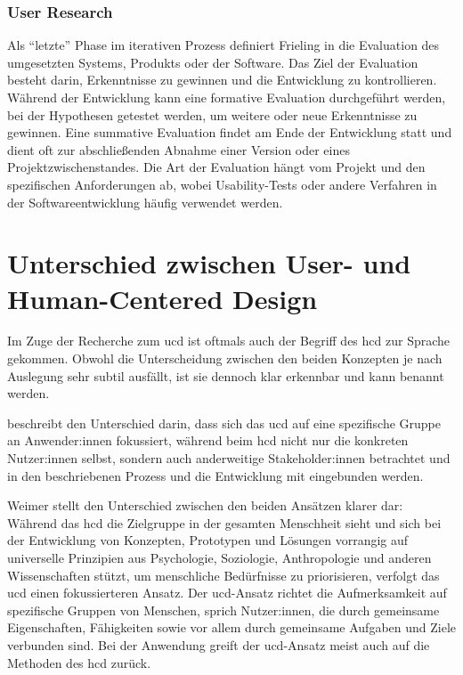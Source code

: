 \documentclass[a4paper,12pt,twoside]{scrreprt}
\begin{document}
\subsubsection*{User Research}
\label{sub-sub-sec:user-research}

Als \enquote{letzte} Phase im iterativen Prozess definiert Frieling in \cite{frieling_user_2019} die Evaluation des umgesetzten Systems, Produkts oder der Software. Das Ziel der Evaluation besteht darin, Erkenntnisse zu gewinnen und die Entwicklung zu kontrollieren. Während der Entwicklung kann eine formative Evaluation durchgeführt werden, bei der Hypothesen getestet werden, um weitere oder neue Erkenntnisse zu gewinnen. Eine summative Evaluation findet am Ende der Entwicklung statt und dient oft zur abschließenden Abnahme einer Version oder eines Projektzwischenstandes. Die Art der Evaluation hängt vom Projekt und den spezifischen Anforderungen ab, wobei Usability-Tests oder andere Verfahren in der Softwareentwicklung häufig verwendet werden. \cite{frieling_user_2019}

\section{Unterschied zwischen User- und Human-Centered Design}
\label{sec:unterschied-ucd-hcd}

Im Zuge der Recherche zum \acl{ucd} ist oftmals auch der Begriff des \ac{hcd} zur Sprache gekommen. Obwohl die Unterscheidung zwischen den beiden Konzepten je nach Auslegung sehr subtil ausfällt, ist sie dennoch klar erkennbar und kann benannt werden.

\medskip

\cite{ionos_se_user-centered_2022} beschreibt den Unterschied darin, dass sich das \ac{ucd} auf eine spezifische Gruppe an Anwender:innen fokussiert, während beim \ac{hcd} nicht nur die konkreten Nutzer:innen selbst, sondern auch anderweitige Stakeholder:innen betrachtet und in den beschriebenen Prozess und die Entwicklung mit eingebunden werden.

\medskip

Weimer stellt den Unterschied zwischen den beiden Ansätzen klarer dar: Während das \ac{hcd} die Zielgruppe in der gesamten Menschheit sieht und sich bei der Entwicklung von Konzepten, Prototypen und Lösungen vorrangig auf universelle Prinzipien aus Psychologie, Soziologie, Anthropologie und anderen Wissenschaften stützt, um menschliche Bedürfnisse zu priorisieren, verfolgt das \ac{ucd} einen fokussierteren Ansatz. Der \ac{ucd}-Ansatz richtet die Aufmerksamkeit auf spezifische Gruppen von Menschen, sprich Nutzer:innen, die durch gemeinsame Eigenschaften, Fähigkeiten sowie vor allem durch gemeinsame Aufgaben und Ziele verbunden sind. Bei der Anwendung greift der \ac{ucd}-Ansatz meist auch auf die Methoden des \ac{hcd} zurück. \cite{weimer_difference_2022}
\end{document}
